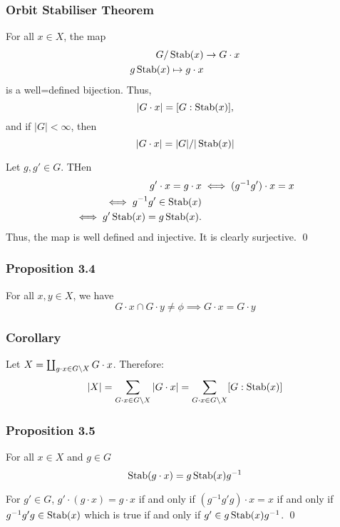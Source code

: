 \documentclass{article}
\renewenvironment{proof}{{\bfseries\color{blue1} Proof:}}{\qed}
\begin{document}
\subsubsection{Orbit Stabiliser Theorem}
\begin{idea}
    For all $x\in X$, the map
    \begin{align*}
        G/\operatorname{Stab}(x) &\rightarrow G\cdot x \\ 
        g\operatorname{Stab}(x) \mapsto g\cdot x
    \end{align*}
    is a well=defined bijection. Thus,
    \begin{equation*}
        |G\cdot x| = [G:\operatorname{Stab}(x)],
    \end{equation*}
    and if $|G|<\infty$, then
    \begin{equation*}
        |G\cdot x| = |G|/|\operatorname{Stab}(x)|
    \end{equation*}
\end{idea}
\begin{proof}
    Let $g,g'\in G$. THen
    \begin{align*}
        g'\cdot x = g\cdot x &\iff (g^{-1}g')\cdot x = x \\ 
        \iff g^{-1}g' \in \operatorname{Stab}(x) \\ 
        \iff g'\operatorname{Stab}(x) = g\operatorname{Stab}(x).
    \end{align*}
    Thus, the map is well defined and injective. It is clearly surjective.
\end{proof}
\subsubsection{Proposition 3.4}
\begin{idea}
    For all $x,y\in X$, we have
    \begin{equation*}
        G\cdot x \cap G\cdot y \neq \phi \implies G\cdot x = G\cdot y
    \end{equation*}
\end{idea}
\subsubsection{Corollary}
\begin{idea}
    Let $X=\coprod_{g\cdot x \in G \text{\textbackslash} X} G\cdot x$. Therefore:
    \begin{equation*}
        |X|=\sum_{G\cdot x\in G\text{\textbackslash} X}|G\cdot x| = \sum_{G\cdot x\in G\text{\textbackslash} X}[G:\operatorname{Stab}(x)]
    \end{equation*}
\end{idea}
\subsubsection{Proposition 3.5}
\begin{idea}
    For all $x\in X$ and $g\in G$
    \begin{equation*}
        \operatorname{Stab}(g\cdot x)=g\operatorname{Stab}(x)g^{-1}
    \end{equation*}
\end{idea}
\begin{proof}
    For $g'\in G$, $g'\cdot (g\cdot x)=g\cdot x$ if and only if $(g^{-1}g'g)\cdot x = x$ if and only if $g^{-1}g'g\in \operatorname{Stab}(x)$ which is true if and only if $g'\in g\operatorname{Stab}(x)g^{-1}$.
\end{proof}
\end{document}
